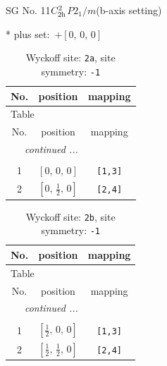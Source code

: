 \documentclass[fleqn,8pt]{jsarticle}
\begin{document}
\setcounter{MaxMatrixCols}{32}

\renewcommand{\tablename}{Table~}
\renewcommand{\figurename}{Figure~}
\begin{center}
\LARGE
SG No. 11\quad$C_{\rm 2h}^{2}$\quad$P2_1/m$\quad(b-axis setting)\quad[ monoclinic ]
\end{center}
* plus set:\,\,\,$+\left[ 0,\, 0,\, 0 \right]$
\renewcommand{\arraystretch}{1.2}
\begin{longtable}{ccc}
\caption{Wyckoff site: {\tt 2a}, site symmetry: {\tt -1}}
 \\
 \hline \hline
No. & position & mapping \\ \hline \endfirsthead

\multicolumn{2}{l}{\tablename\ \thetable{}} \\
 \hline \hline
No. & position & mapping \\ \hline \endhead

 \hline \hline
\multicolumn{2}{r}{\footnotesize\it continued ...} \\ \endfoot

 \hline \hline
\multicolumn{2}{r}{} \\ \endlastfoot

1 & $\left[ 0,\, 0,\, 0 \right]$ & {\tt [1,3]} \\ \hline
2 & $\left[ 0,\, \frac{1}{2},\, 0 \right]$ & {\tt [2,4]} \\
\end{longtable}
\renewcommand{\arraystretch}{1.2}
\begin{longtable}{ccc}
\caption{Wyckoff site: {\tt 2b}, site symmetry: {\tt -1}}
 \\
 \hline \hline
No. & position & mapping \\ \hline \endfirsthead

\multicolumn{2}{l}{\tablename\ \thetable{}} \\
 \hline \hline
No. & position & mapping \\ \hline \endhead

 \hline \hline
\multicolumn{2}{r}{\footnotesize\it continued ...} \\ \endfoot

 \hline \hline
\multicolumn{2}{r}{} \\ \endlastfoot

1 & $\left[ \frac{1}{2},\, 0,\, 0 \right]$ & {\tt [1,3]} \\ \hline
2 & $\left[ \frac{1}{2},\, \frac{1}{2},\, 0 \right]$ & {\tt [2,4]} \\
\end{longtable}
\end{document}
